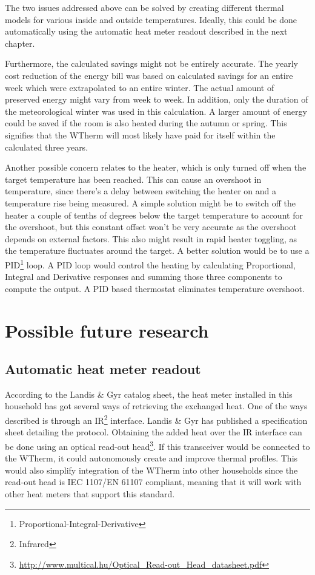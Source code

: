 \documentclass[12pt,a4paper,final]{report}
\begin{document}
The two issues addressed above can be solved by creating different thermal models for various inside and outside temperatures. Ideally, this could be done automatically using the automatic heat meter readout described in the next chapter.

Furthermore, the calculated savings might not be entirely accurate. The yearly cost reduction of the energy bill was based on calculated savings for an entire week which were extrapolated to an entire winter. The actual amount of preserved energy might vary from week to week. In addition, only the duration of the meteorological winter was used in this calculation. A larger amount of energy could be saved if the room is also heated during the autumn or spring. This signifies that the WTherm will most likely have paid for itself within the calculated three years.

Another possible concern relates to the heater, which is only turned off when the target temperature has been reached. This can cause an overshoot in temperature, since there's a delay between switching the heater on and a temperature rise being measured. A simple solution might be to switch off the heater a couple of tenths of degrees below the target temperature to account for the overshoot, but this constant offset won't be very accurate as the overshoot depends on external factors. This also might result in rapid heater toggling, as the temperature fluctuates around the target. A better solution would be to use a PID\footnote{Proportional-Integral-Derivative} loop. A PID loop would control the heating by calculating Proportional, Integral and Derivative responses and summing those three components to compute the output\cite{PIDexplained}. A PID based thermostat eliminates temperature overshoot.


\chapter{Possible future research}
\section{Automatic heat meter readout}
According to the Landis \& Gyr catalog sheet, the heat meter installed in this household has got several ways of retrieving the exchanged heat\cite{landisgyrcat14}. One of the ways described is through an IR\footnote{Infrared} interface. Landis \& Gyr has published a specification sheet\cite{landisgyrser14} detailing the protocol. Obtaining the added heat over the IR interface can be done using an optical read-out head\footnote{\url{http://www.multical.hu/Optical_Read-out_Head_datasheet.pdf}}. If this transceiver would be connected to the WTherm, it could autonomously create and improve thermal profiles. This would also simplify integration of the WTherm into other households since the read-out head is IEC 1107/EN 61107 compliant, meaning that it will work with other heat meters that support this standard.
\end{document}
